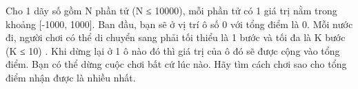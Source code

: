 Cho 1 dãy số gồm N phần tử (N ≤ 10000), mỗi phần tử có 1 giá trị nằm trong khoảng [-1000, 1000]. Ban đầu, bạn sẽ ở vị trí ô số 0 với tổng điểm là 0. Mỗi nước đi, người chơi có thể di chuyển sang phải tối thiểu là 1 bước và tối đa là K bước (K ≤ 10) . Khi dừng lại ở 1 ô nào đó thì giá trị của ô đó sẽ được cộng vào tổng điểm. Bạn có thể dừng cuộc chơi bất cứ lúc nào. Hãy tìm cách chơi sao cho tổng điểm nhận được là nhiều nhất.  

\